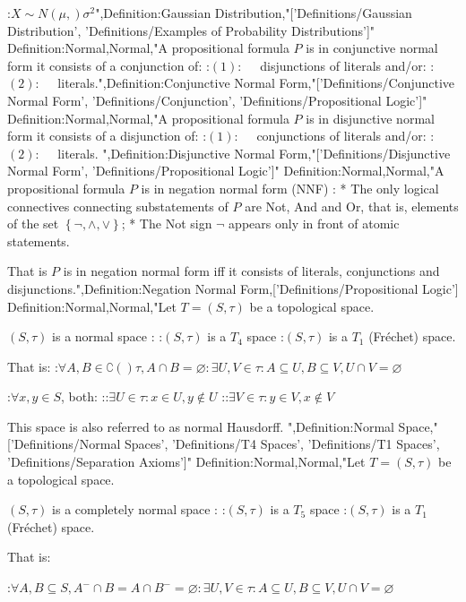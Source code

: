 :$X \sim N \left( \mu,   \right){\sigma^2}$",Definition:Gaussian Distribution,"['Definitions/Gaussian Distribution', 'Definitions/Examples of Probability Distributions']"
Definition:Normal,Normal,"A propositional formula $P$ is in conjunctive normal form  it consists of a conjunction of:
:$(1): \quad$ disjunctions of literals
and/or:
:$(2): \quad$ literals.",Definition:Conjunctive Normal Form,"['Definitions/Conjunctive Normal Form', 'Definitions/Conjunction', 'Definitions/Propositional Logic']"
Definition:Normal,Normal,"A propositional formula $P$ is in disjunctive normal form  it consists of a disjunction of:
:$(1): \quad$ conjunctions of literals
and/or:
:$(2): \quad$ literals.
",Definition:Disjunctive Normal Form,"['Definitions/Disjunctive Normal Form', 'Definitions/Propositional Logic']"
Definition:Normal,Normal,"A propositional formula $P$ is in negation normal form (NNF) :
* The only logical connectives connecting substatements of $P$ are Not, And and Or, that is, elements of the set $\left\{{\neg, \land, \lor}\right\}$;
* The Not sign $\neg$ appears only in front of atomic statements.

That is $P$ is in negation normal form iff it consists of literals, conjunctions and disjunctions.",Definition:Negation Normal Form,['Definitions/Propositional Logic']
Definition:Normal,Normal,"Let $T = \left( S, \tau \right)$ be a topological space.


$\left( S, \tau \right)$ is a normal space :
:$\left( S, \tau \right)$ is a $T_4$ space
:$\left( S, \tau \right)$ is a $T_1$ (Fréchet) space.


That is:
:$\forall A, B \in \complement \left(   \right)\tau, A \cap B = \varnothing: \exists U, V \in \tau: A \subseteq U, B \subseteq V, U \cap V = \varnothing$ 

:$\forall x, y \in S$, both:
::$\exists U \in \tau: x \in U, y \notin U$
::$\exists V \in \tau: y \in V, x \notin V$



This space is also referred to as normal Hausdorff.
",Definition:Normal Space,"['Definitions/Normal Spaces', 'Definitions/T4 Spaces', 'Definitions/T1 Spaces', 'Definitions/Separation Axioms']"
Definition:Normal,Normal,"Let $T = \left( S, \tau \right)$ be a topological space.


$\left( S, \tau \right)$ is a completely normal space :
:$\left( S, \tau \right)$ is a $T_5$ space
:$\left( S, \tau \right)$ is a $T_1$ (Fréchet) space.


That is:

:$\forall A, B \subseteq S, A^- \cap B = A \cap B^- = \varnothing: \exists U, V \in \tau: A \subseteq U, B \subseteq V, U \cap V = \varnothing$ 

